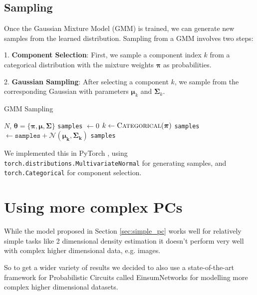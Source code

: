 \subsection{Sampling}
\label{sec:gmm_sampling}

Once the Gaussian Mixture Model (GMM) is trained, we can generate new samples from the learned distribution. Sampling from a GMM involves two steps:

1. \textbf{Component Selection}: First, we sample a component index $k$ from a categorical distribution with the mixture weights $\boldsymbol{\pi}$ as probabilities.
   
2. \textbf{Gaussian Sampling}: After selecting a component $k$, we sample from the corresponding Gaussian with parameters $\boldsymbol{\mu}_k$ and $\boldsymbol{\Sigma}_k$. 

\begin{algorithm}
    \caption{GMM Sampling}
    \label{alg:gmm_sampling}
    \begin{algorithmic}[1]  
        \Require $N$, $\boldsymbol{\theta} = \{\boldsymbol{\pi}, \boldsymbol{\mu}, \boldsymbol{\Sigma}\}$
        \State \texttt{samples} $\gets 0$
            \State $ k \gets \textsc{Categorical}(\boldsymbol{\pi})$
            \State \texttt{samples} $\gets \texttt{samples} + \mathcal{N}(\boldsymbol{\mu_k}, \boldsymbol{\Sigma_k})$
        \EndFor
        \State \Return \texttt{samples}
    \end{algorithmic}
\end{algorithm}

We implemented this in PyTorch \cite{pytorch}, using \\
\texttt{torch.distributions.MultivariateNormal} for generating samples, and \texttt{torch.Categorical} for component selection.

\section{Using more complex PCs}

While the model proposed in Section \ref{sec:simple_pc} works well for relatively simple tasks like 2 dimensional density estimation
it doesn't perform very well with complex higher dimensional data, e.g. images. 

So to get a wider variety of results we decided to also use a state-of-the-art framework for Probabilistic Circuits called 
EinsumNetworks \cite{einsum} for modelling more complex higher dimensional datasets. 

